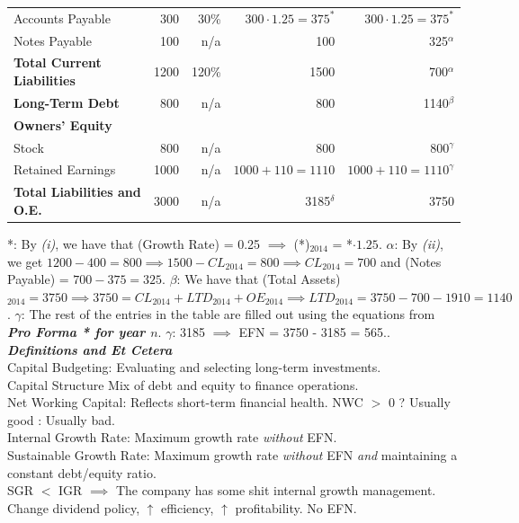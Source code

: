 \documentclass{letter}
\newcommand{\textib}[1]{\textit{\textbf{{#1}}}}
\begin{document}
\begin{tabular}{l r r r r}
    Accounts Payable & 300 & 30\% & $300 \cdot 1.25 = 375^*$ & $300 \cdot 1.25 = 375^*$ \\
    Notes Payable & 100 & n/a & 100 & 325$^{\alpha}$ \\
    \textbf{Total Current Liabilities} & 1200 & 120\% & 1500 & 700$^{\alpha}$ \\
    \midrule
    \textbf{Long-Term Debt} & 800 & n/a & 800 & 1140$^{\beta}$ \\
    \midrule
    \textbf{Owners' Equity} \\
    Stock & 800 & n/a & 800 & 800$^{\gamma}$ \\
    Retained Earnings & 1000 & n/a & $1000 + 110 = 1110$ & $1000 + 110 = 1110^{\gamma}$ \\
    \midrule
    \textbf{Total Liabilities and O.E.} & 3000 & n/a & 3185$^{\delta}$ & 3750 \\
    \bottomrule
\end{tabular}
\newline
*: By \textit{(i)}, we have that (Growth Rate) = 0.25 $\implies$ (*)$_{2014}$ = *$\cdot 1.25$.
\newline
$\alpha$: By \textit{(ii)}, we get $1200 - 400 = 800 \implies 1500 - CL_{2014} = 800 \implies CL_{2014} = 700$ and
(Notes Payable) = $700 - 375 = 325$.
\newline
$\beta$: We have that (Total Assets)$_{2014} = 3750 \implies 3750 = CL_{2014} + LTD_{2014} + OE_{2014} 
\implies LTD_{2014} = 3750 - 700 - 1910 = 1140$.
\newline
$\gamma$: The rest of the entries in the table are filled out using the equations from \textib{Pro Forma * for year $n$}.
\newline
$\gamma$: 3185 $\implies$ EFN = 3750 - 3185 = 565..
\newline
\textib{Definitions and Et Cetera} \\
Capital Budgeting: Evaluating and selecting long-term investments. \\
Capital Structure Mix of debt and equity to finance operations. \\
Net Working Capital: Reflects short-term financial health. NWC $>$ 0 ? Usually good : Usually bad. \\
Internal Growth Rate: Maximum growth rate \textit{without} EFN. \\
Sustainable Growth Rate: Maximum growth rate \textit{without} EFN \textit{and} maintaining a constant debt/equity ratio. \\
SGR $<$ IGR $\implies$ The company has some shit internal growth management. Change dividend policy, $\uparrow$ efficiency, $\uparrow$ profitability. No EFN. \\
\end{document}
